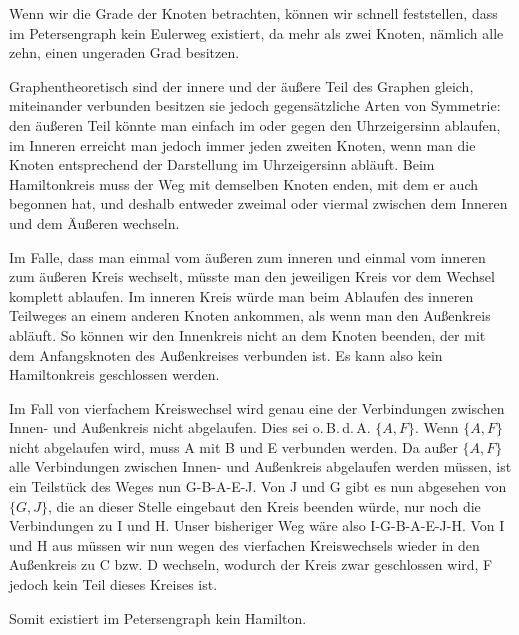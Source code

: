 Wenn wir die Grade der Knoten betrachten, können wir schnell feststellen, dass im Petersengraph kein Eulerweg existiert, da mehr als zwei Knoten, nämlich alle zehn, einen ungeraden Grad besitzen.

Graphentheoretisch sind der innere und der äußere Teil des Graphen gleich, miteinander verbunden besitzen sie jedoch gegensätzliche Arten von Symmetrie: den äußeren Teil könnte man einfach im oder gegen den Uhrzeigersinn ablaufen, im Inneren erreicht man jedoch immer jeden zweiten Knoten, wenn man die Knoten entsprechend der Darstellung im Uhrzeigersinn abläuft. Beim Hamiltonkreis muss der Weg mit demselben Knoten enden, mit dem er auch begonnen hat, und deshalb entweder zweimal oder viermal zwischen dem Inneren und dem Äußeren wechseln.

Im Falle, dass man einmal vom äußeren zum inneren und einmal vom inneren zum äußeren Kreis wechselt, müsste man den jeweiligen Kreis vor dem Wechsel komplett ablaufen. Im inneren Kreis würde man beim Ablaufen des inneren Teilweges an einem anderen Knoten ankommen, als wenn man den Außenkreis abläuft. So können wir den Innenkreis nicht an dem Knoten beenden, der mit dem Anfangsknoten des Außenkreises verbunden ist. Es kann also kein Hamiltonkreis geschlossen werden.

Im Fall von vierfachem Kreiswechsel wird genau eine der Verbindungen zwischen Innen- und Außenkreis nicht abgelaufen. Dies sei o.\,B.\,d.\,A. $\{A,F\}$. Wenn $\{A,F\}$ nicht abgelaufen wird, muss A mit B und E verbunden werden. Da außer $\{A,F\}$ alle Verbindungen zwischen Innen- und Außenkreis abgelaufen werden müssen, ist ein Teilstück des Weges nun G-B-A-E-J. Von J und G gibt es nun abgesehen von $\{G,J\}$, die an dieser Stelle eingebaut den Kreis beenden würde, nur noch die Verbindungen zu I und H. Unser bisheriger Weg wäre also I-G-B-A-E-J-H. Von I und H aus müssen wir nun wegen des vierfachen Kreiswechsels wieder in den Außenkreis zu C bzw. D wechseln, wodurch der Kreis zwar geschlossen wird, F jedoch kein Teil dieses Kreises ist.

Somit existiert im Petersengraph kein Hamilton.
